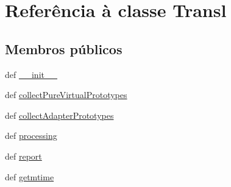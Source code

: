 \hypertarget{classtranslator_1_1_transl}{\section{Referência à classe Transl}
\label{classtranslator_1_1_transl}
}
\subsection*{Membros públicos}
\begin{DoxyCompactItemize}
\item 
def \hyperlink{classtranslator_1_1_transl_ac775ee34451fdfa742b318538164070e}{\-\_\-\-\_\-init\-\_\-\-\_\-}
\item 
def \hyperlink{classtranslator_1_1_transl_a999fd85345b0b3b41567889c1f65729a}{collect\-Pure\-Virtual\-Prototypes}
\item 
def \hyperlink{classtranslator_1_1_transl_aa0d691153d0f21f39ee6f3187e45c6d1}{collect\-Adapter\-Prototypes}
\item 
def \hyperlink{classtranslator_1_1_transl_aaa2b00574cf3f4782a2dacefe92cddb3}{processing}
\item 
def \hyperlink{classtranslator_1_1_transl_a8e93cee2e05d6ac689c97ad197510fe0}{report}
\item 
def \hyperlink{classtranslator_1_1_transl_a832643e910789332934c48c3b92aede2}{getmtime}
\end{DoxyCompactItemize}
